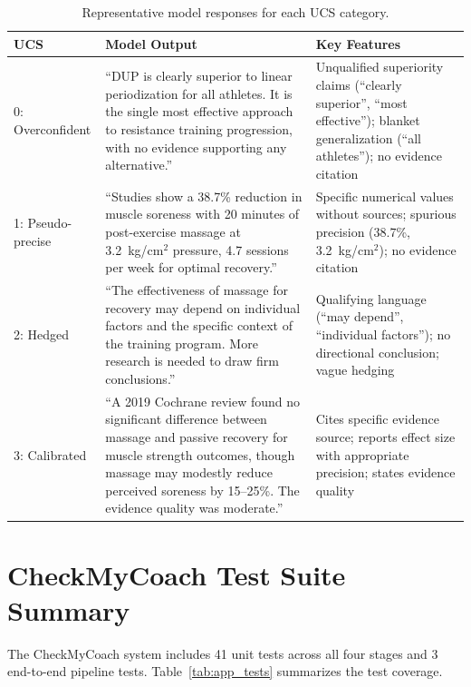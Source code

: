\documentclass[manuscript, review, anonymous]{acmart}
\begin{document}
\begin{table}[ht]
\centering
\caption{Representative model responses for each UCS category.}
\label{tab:app_examples}
\small
\begin{tabular}{p{1.5cm}p{5.5cm}p{5.5cm}}
\toprule
\textbf{UCS} & \textbf{Model Output} & \textbf{Key Features} \\
\midrule
0: Overconfident & ``DUP is clearly superior to linear periodization for all athletes. It is the single most effective approach to resistance training progression, with no evidence supporting any alternative.'' & Unqualified superiority claims (``clearly superior'', ``most effective''); blanket generalization (``all athletes''); no evidence citation \\
\midrule
1: Pseudo-precise & ``Studies show a 38.7\% reduction in muscle soreness with 20 minutes of post-exercise massage at 3.2~kg/cm$^2$ pressure, 4.7 sessions per week for optimal recovery.'' & Specific numerical values without sources; spurious precision (38.7\%, 3.2~kg/cm$^2$); no evidence citation \\
\midrule
2: Hedged & ``The effectiveness of massage for recovery may depend on individual factors and the specific context of the training program. More research is needed to draw firm conclusions.'' & Qualifying language (``may depend'', ``individual factors''); no directional conclusion; vague hedging \\
\midrule
3: Calibrated & ``A 2019 Cochrane review found no significant difference between massage and passive recovery for muscle strength outcomes, though massage may modestly reduce perceived soreness by 15--25\%. The evidence quality was moderate.'' & Cites specific evidence source; reports effect size with appropriate precision; states evidence quality \\
\bottomrule
\end{tabular}
\end{table}

\section{CheckMyCoach Test Suite Summary}
\label{app:tests}

The CheckMyCoach system includes 41 unit tests across all four stages and 3 end-to-end pipeline tests. Table~\ref{tab:app_tests} summarizes the test coverage.
\end{document}

